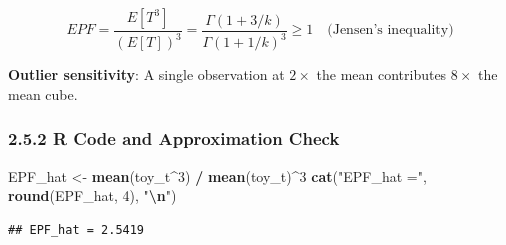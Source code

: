 \documentclass[
]{article}
\newenvironment{Shaded}{\begin{snugshade}}{\end{snugshade}}
\newcommand{\DecValTok}[1]{\textcolor[rgb]{0.00,0.00,0.81}{#1}}
\newcommand{\FunctionTok}[1]{\textcolor[rgb]{0.13,0.29,0.53}{\textbf{#1}}}
\newcommand{\NormalTok}[1]{#1}
\newcommand{\OtherTok}[1]{\textcolor[rgb]{0.56,0.35,0.01}{#1}}
\newcommand{\SpecialCharTok}[1]{\textcolor[rgb]{0.81,0.36,0.00}{\textbf{#1}}}
\newcommand{\StringTok}[1]{\textcolor[rgb]{0.31,0.60,0.02}{#1}}
\begin{document}
\[EPF = \frac{E[T^3]}{(E[T])^3} = \frac{\Gamma(1+3/k)}{\Gamma(1+1/k)^3} \geq 1 \quad \text{(Jensen's inequality)}\]

\textbf{Outlier sensitivity}: A single observation at \(2\times\) the
mean contributes \(8\times\) the mean cube.

\subsubsection{2.5.2 R Code and Approximation
Check}\label{r-code-and-approximation-check}

\begin{Shaded}
\begin{Highlighting}[]
\NormalTok{EPF\_hat }\OtherTok{\textless{}{-}} \FunctionTok{mean}\NormalTok{(toy\_t}\SpecialCharTok{\^{}}\DecValTok{3}\NormalTok{) }\SpecialCharTok{/} \FunctionTok{mean}\NormalTok{(toy\_t)}\SpecialCharTok{\^{}}\DecValTok{3}
\FunctionTok{cat}\NormalTok{(}\StringTok{"EPF\_hat ="}\NormalTok{, }\FunctionTok{round}\NormalTok{(EPF\_hat, }\DecValTok{4}\NormalTok{), }\StringTok{"}\SpecialCharTok{\textbackslash{}n}\StringTok{"}\NormalTok{)}
\end{Highlighting}
\end{Shaded}

\begin{verbatim}
## EPF_hat = 2.5419
\end{verbatim}
\end{document}

